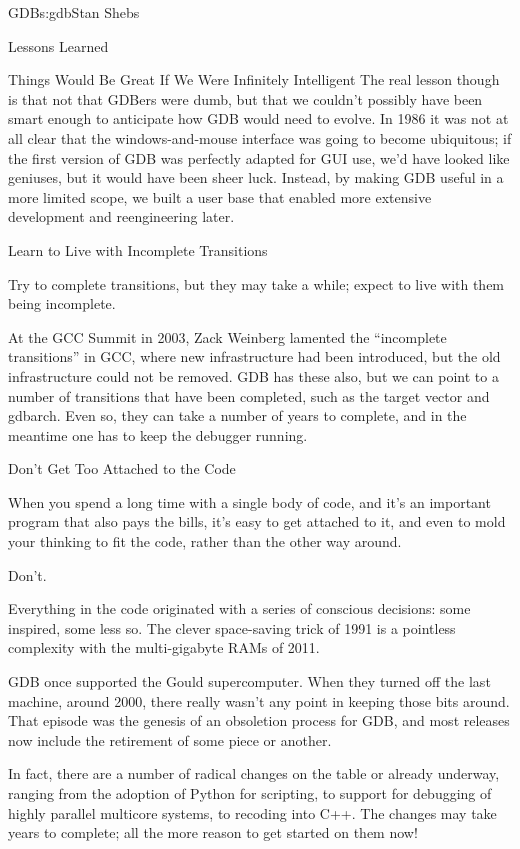 \begin{aosachapter}{GDB}{s:gdb}{Stan Shebs}
\begin{aosasect1}{Lessons Learned}
\begin{aosasect2}{Things Would Be Great If We Were Infinitely Intelligent}
The real lesson though is that not that GDBers were dumb, but that we
couldn't possibly have been smart enough to anticipate how GDB would
need to evolve.  In 1986 it was not at all clear that the
windows-and-mouse interface was going to become ubiquitous; if the
first version of GDB was perfectly adapted for GUI use, we'd have
looked like geniuses, but it would have been sheer luck.  Instead,
by making GDB useful in a more limited scope, we built a user base
that enabled more extensive development and reengineering later.

\end{aosasect2}

\begin{aosasect2}{Learn to Live with Incomplete Transitions}

Try to complete transitions, but they may take a while; expect to live
with them being incomplete.

At the GCC Summit in 2003, Zack Weinberg lamented the ``incomplete
transitions'' in GCC, where new infrastructure had been introduced,
but the old infrastructure could not be removed.  GDB has these also,
but we can point to a number of transitions that have been completed,
such as the target vector and gdbarch.  Even so, they can take a
number of years to complete, and in the meantime one has to keep the
debugger running.

\end{aosasect2}

\begin{aosasect2}{Don't Get Too Attached to the Code}

When you spend a long time with a single body of code, and it's an
important program that also pays the bills, it's easy to get attached
to it, and even to mold your thinking to fit the code, rather than the
other way around.

Don't.

Everything in the code originated with a series of conscious
decisions: some inspired, some less so.  The clever space-saving trick
of 1991 is a pointless complexity with the multi-gigabyte RAMs of
2011.

GDB once supported the Gould supercomputer. When they turned off the
last machine, around 2000, there really wasn't any point in keeping
those bits around.  That episode was the genesis of an obsoletion
process for GDB, and most releases now include the retirement of
some piece or another.

In fact, there are a number of radical changes on the table or already
underway, ranging from the adoption of Python for scripting, to
support for debugging of highly parallel multicore systems, to
recoding into C++.  The changes may take years to complete; all the
more reason to get started on them now!

\end{aosasect2}

\end{aosasect1}

\end{aosachapter}
